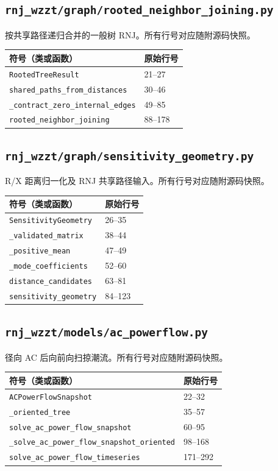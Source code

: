 \subsection{\texorpdfstring{\nolinkurl{rnj_wzzt/graph/rooted_neighbor_joining.py}}{rnj\_wzzt/graph/rooted\_neighbor\_joining.py}}\label{module:graph.rooted_neighbor_joining}
按共享路径递归合并的一般树 RNJ。所有行号对应随附源码快照。
\begin{longtable}{P{0.73\textwidth}P{0.18\textwidth}}\toprule 符号（类或函数） & 原始行号\\\midrule\endhead
\nolinkurl{RootedTreeResult} & 21--27 \\
\nolinkurl{shared_paths_from_distances} & 30--46 \\
\nolinkurl{_contract_zero_internal_edges} & 49--85 \\
\nolinkurl{rooted_neighbor_joining} & 88--178 \\
\bottomrule\end{longtable}
\subsection{\texorpdfstring{\nolinkurl{rnj_wzzt/graph/sensitivity_geometry.py}}{rnj\_wzzt/graph/sensitivity\_geometry.py}}\label{module:graph.sensitivity_geometry}
R/X 距离归一化及 RNJ 共享路径输入。所有行号对应随附源码快照。
\begin{longtable}{P{0.73\textwidth}P{0.18\textwidth}}\toprule 符号（类或函数） & 原始行号\\\midrule\endhead
\nolinkurl{SensitivityGeometry} & 26--35 \\
\nolinkurl{_validated_matrix} & 38--44 \\
\nolinkurl{_positive_mean} & 47--49 \\
\nolinkurl{_mode_coefficients} & 52--60 \\
\nolinkurl{distance_candidates} & 63--81 \\
\nolinkurl{sensitivity_geometry} & 84--123 \\
\bottomrule\end{longtable}
\subsection{\texorpdfstring{\nolinkurl{rnj_wzzt/models/ac_powerflow.py}}{rnj\_wzzt/models/ac\_powerflow.py}}\label{module:models.ac_powerflow}
径向 AC 后向前向扫掠潮流。所有行号对应随附源码快照。
\begin{longtable}{P{0.73\textwidth}P{0.18\textwidth}}\toprule 符号（类或函数） & 原始行号\\\midrule\endhead
\nolinkurl{ACPowerFlowSnapshot} & 22--32 \\
\nolinkurl{_oriented_tree} & 35--57 \\
\nolinkurl{solve_ac_power_flow_snapshot} & 60--95 \\
\nolinkurl{_solve_ac_power_flow_snapshot_oriented} & 98--168 \\
\nolinkurl{solve_ac_power_flow_timeseries} & 171--292 \\
\bottomrule\end{longtable}
